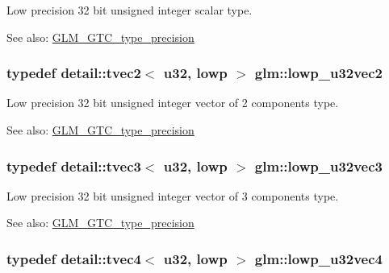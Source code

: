 Low precision 32 bit unsigned integer scalar type. \begin{Desc}
\item[See also:]\hyperlink{group__gtc__type__precision}{GLM\_\-GTC\_\-type\_\-precision} \end{Desc}
\hypertarget{group__gtc__type__precision_g2f588e15c609987b89bd03f50b2a492d}{
\subsubsection[lowp\_\-u32vec2]{\setlength{\rightskip}{0pt plus 5cm}typedef detail::tvec2$<$ u32, lowp $>$ {\bf glm::lowp\_\-u32vec2}}}
\label{group__gtc__type__precision_g2f588e15c609987b89bd03f50b2a492d}


Low precision 32 bit unsigned integer vector of 2 components type. \begin{Desc}
\item[See also:]\hyperlink{group__gtc__type__precision}{GLM\_\-GTC\_\-type\_\-precision} \end{Desc}
\hypertarget{group__gtc__type__precision_g53b6133cd2491fce1445c1744556b1bb}{
\subsubsection[lowp\_\-u32vec3]{\setlength{\rightskip}{0pt plus 5cm}typedef detail::tvec3$<$ u32, lowp $>$ {\bf glm::lowp\_\-u32vec3}}}
\label{group__gtc__type__precision_g53b6133cd2491fce1445c1744556b1bb}


Low precision 32 bit unsigned integer vector of 3 components type. \begin{Desc}
\item[See also:]\hyperlink{group__gtc__type__precision}{GLM\_\-GTC\_\-type\_\-precision} \end{Desc}
\hypertarget{group__gtc__type__precision_gad6408408c9c5321cb6ee54f201de578}{
\subsubsection[lowp\_\-u32vec4]{\setlength{\rightskip}{0pt plus 5cm}typedef detail::tvec4$<$ u32, lowp $>$ {\bf glm::lowp\_\-u32vec4}}}
\label{group__gtc__type__precision_gad6408408c9c5321cb6ee54f201de578}


